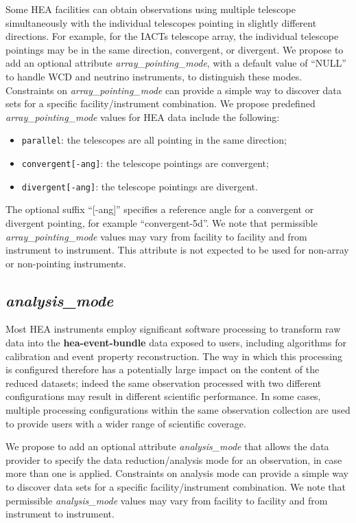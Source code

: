 \documentclass[11pt,a4paper]{ivoa}
\begin{document}
Some \gls{HEA} facilities can obtain observations using multiple telescope simultaneously with the individual telescopes pointing in slightly different directions.  For example, for the \glspl{IACT} telescope array, the individual telescope pointings may be in the same direction, convergent, or divergent.  We propose to add an optional attribute {\em array\_pointing\_mode\/}, with a default value of ``NULL'' to handle \gls{WCD} and neutrino instruments, to distinguish these modes.  Constraints on {\em array\_pointing\_mode\/} can provide a simple way to discover data sets for a specific facility/instrument combination.  We propose predefined {\em array\_pointing\_mode\/} values for \gls{HEA} data include the following:
\begin{itemize}
	\item \texttt{parallel}: the telescopes are all pointing in the same direction;
	\item \texttt{convergent[-ang]}: the telescope pointings are convergent;
	\item \texttt{divergent[-ang]}: the telescope pointings are divergent.
\end{itemize}
The optional suffix ``[-ang]'' specifies a reference angle for a convergent or divergent pointing, for example ``convergent-5d''.  We note that permissible {\em array\_pointing\_mode\/} values may vary from facility to facility and from instrument to instrument. This attribute is not expected to be used for non-array or non-pointing instruments.

\subsection{{\em analysis\_mode}}

Most \gls{HEA} instruments employ significant software processing to transform raw data into the {\bf hea-event-bundle} data exposed to users, including algorithms for calibration and event property reconstruction. The way in which this processing is configured therefore has a potentially large impact on the content of the reduced datasets; indeed the same observation processed with two different configurations may result in different scientific performance. In some cases, multiple processing configurations within the same observation collection are used to provide users with a wider range of scientific coverage.

We propose to add an optional attribute {\em analysis\_mode\/} that allows the data provider to specify the data reduction/analysis mode for an observation, in case more than one is applied. Constraints on analysis mode can provide a simple way to discover data sets for a specific facility/instrument combination. We note that permissible {\em analysis\_mode\/} values may vary from facility to facility and from instrument to instrument.
\end{document}
